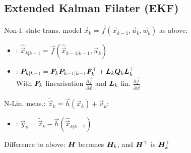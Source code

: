 \subsection{Extended Kalman Filater (EKF)}
Non-l. state trans. model $\vec{x}_k = \vec{f}(\vec{x}_{k - 1}, \vec{u}_k, \vec{w}_k)$ as above:
\begin{itemize}
    \item {}: $\hat{\vec{x}}_{k | k - 1} = \vec{f}(\hat{\vec{x}}_{k - 1 | k - 1}, \vec{u}_k)$
    \item {}: $\bm{P}_{k | k - 1} = \bm{F}_k \bm{P}_{k - 1 | k - 1} \bm{F}_k^\top + \bm{L}_k \bm{Q}_k \bm{L}_k^\top$\\
        With $\bm{F}_k$ linearisation $\frac{\partial \vec{f}}{\partial \vec{x}}$ and $\bm{L}_k$ lin. $\frac{\partial \vec{f}}{\partial \vec{w}}$
\end{itemize}
 N-Lin. meas.: $\tilde{\vec{z}}_k = \vec{h}(\vec{x}_k) + \vec{v}_k$:
\begin{itemize}
    \item {}: $\vec{y}_k = \tilde{\vec{z}}_k - \vec{h}(\hat{\vec{x}}_{k | k - 1})$
\end{itemize}
Difference to above: $\bm{H}$ becomes $\bm{H}_k$, and $\bm{H}^\top$ is $\bm{H}_k^\top$
